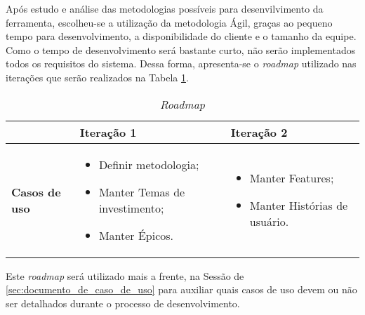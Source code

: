 Após estudo e análise das metodologias possíveis para desenvilvimento da ferramenta, escolheu-se a utilização da metodologia Ágil, graças ao pequeno tempo para desenvolvimento, a disponibilidade do cliente e o tamanho da equipe. Como o tempo de desenvolvimento será bastante curto, não serão implementados todos os requisitos do sistema. Dessa forma, apresenta-se o \textit{roadmap} utilizado nas iterações que serão realizados na Tabela \ref{tab:primeiro_roadmap}.

\vspace{5mm}
\begin{table}[H]
\centering
\begin{tabular}{p{1cm}|p{6cm}|p{}|}

\cline{2-3} &
\textbf{Iteração 1} &
\textbf{Iteração 2}
\\ \hline
\multicolumn{1}{|p{1cm}|}{\textbf{Casos de uso}} &
\begin{itemize}
 	\item Definir metodologia;
 	\item Manter Temas de investimento;
	\item Manter Épicos.
\end{itemize} &
\begin{itemize}
 	\item Manter Features;
	\item Manter Histórias de usuário.
 \end{itemize} 
 \\ \hline
\end{tabular}
\caption{\textit{Roadmap}}
\label{tab:primeiro_roadmap}
\end{table}

Este \textit{roadmap} será utilizado mais a frente, na Sessão de \ref{sec:documento_de_caso_de_uso} para auxiliar quais casos de uso devem ou não ser detalhados durante o processo de desenvolvimento.